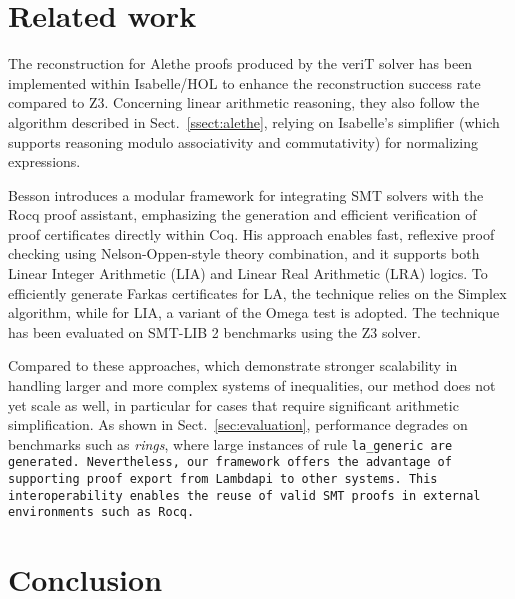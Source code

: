 \documentclass[runningheads,envcountsame]{llncs}
\begin{document}










\section{Related work}
\label{sec:related}

The reconstruction for Alethe proofs produced by the veriT solver has been implemented within Isabelle/HOL \cite{aletheInIsa} to enhance the reconstruction success rate compared to Z3.
Concerning linear arithmetic reasoning, they also follow the algorithm described in Sect.~\ref{ssect:alethe}, relying on Isabelle's simplifier (which supports reasoning modulo associativity and commutativity) for normalizing expressions.

Besson \cite{micromega} introduces a modular framework for integrating SMT solvers with the Rocq proof assistant, emphasizing the generation and efficient verification of proof certificates directly within Coq.
His approach enables fast, reflexive proof checking using Nelson-Oppen-style theory combination, and it supports both Linear Integer Arithmetic (LIA) and Linear Real Arithmetic (LRA) logics.
To efficiently generate Farkas certificates for LA, the technique relies on the Simplex algorithm, while for LIA, a variant of the Omega test \cite{omegatest} is adopted.
The technique has been evaluated on SMT-LIB 2 benchmarks using the Z3 solver.

Compared to these approaches, which demonstrate stronger scalability in handling larger and more complex systems of inequalities, our method does not yet scale as well, in particular for cases that require significant arithmetic simplification.
As shown in Sect.~\ref{sec:evaluation}, performance degrades on benchmarks such as \emph{rings}, where large instances of rule \tt{la\_generic} are generated.
Nevertheless, our framework offers the advantage of supporting proof export from Lambdapi to other systems. This interoperability enables the reuse of valid SMT proofs in external environments such as Rocq.


\section{Conclusion}
\label{sec:conclusion}
\end{document}
